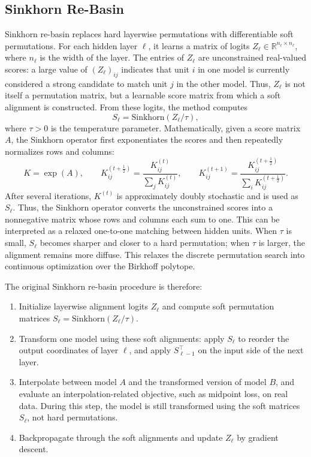 \documentclass[11pt,a4paper]{report}
\begin{document}
\subsection{Sinkhorn Re-Basin}

Sinkhorn re-basin \citet{guerrero2023rebasin} replaces hard layerwise permutations with differentiable soft permutations. For each hidden layer \(\ell\), it learns a matrix of logits \(Z_\ell \in \mathbb{R}^{n_\ell \times n_\ell}\), where \(n_\ell\) is the width of the layer. The entries of \(Z_\ell\) are unconstrained real-valued scores: a large value of \((Z_\ell)_{ij}\) indicates that unit \(i\) in one model is currently considered a strong candidate to match unit \(j\) in the other model. Thus, \(Z_\ell\) is not itself a permutation matrix, but a learnable score matrix from which a soft alignment is constructed. From these logits, the method computes
\[
S_\ell=\mathrm{Sinkhorn}(Z_\ell/\tau),
\]
where \(\tau>0\) is the temperature parameter. Mathematically, given a score matrix \(A\), the Sinkhorn operator first exponentiates the scores and then repeatedly normalizes rows and columns:
\[
K=\exp(A),\qquad
K^{(t+\frac{1}{2})}_{ij}
=
\frac{K^{(t)}_{ij}}{\sum_j K^{(t)}_{ij}},
\qquad
K^{(t+1)}_{ij}
=
\frac{K^{(t+\frac{1}{2})}_{ij}}{\sum_i K^{(t+\frac{1}{2})}_{ij}}.
\]
After several iterations, \(K^{(t)}\) is approximately doubly stochastic and is used as \(S_\ell\). Thus, the Sinkhorn operator converts the unconstrained scores into a nonnegative matrix whose rows and columns each sum to one. This can be interpreted as a relaxed one-to-one matching between hidden units. When \(\tau\) is small, \(S_\ell\) becomes sharper and closer to a hard permutation; when \(\tau\) is larger, the alignment remains more diffuse. This relaxes the discrete permutation search into continuous optimization over the Birkhoff polytope.

The original Sinkhorn re-basin procedure is therefore:
\begin{enumerate}
    \item Initialize layerwise alignment logits \(Z_\ell\) and compute soft permutation matrices \(S_\ell=\mathrm{Sinkhorn}(Z_\ell/\tau)\).
    \item Transform one model using these soft alignments: apply \(S_\ell\) to reorder the output coordinates of layer \(\ell\), and apply \(S_{\ell-1}^{\top}\) on the input side of the next layer.
    \item Interpolate between model \(A\) and the transformed version of model \(B\), and evaluate an interpolation-related objective, such as midpoint loss, on real data. During this step, the model is still transformed using the soft matrices \(S_\ell\), not hard permutations.
    \item Backpropagate through the soft alignments and update \(Z_\ell\) by gradient descent.
\end{enumerate}
\end{document}
